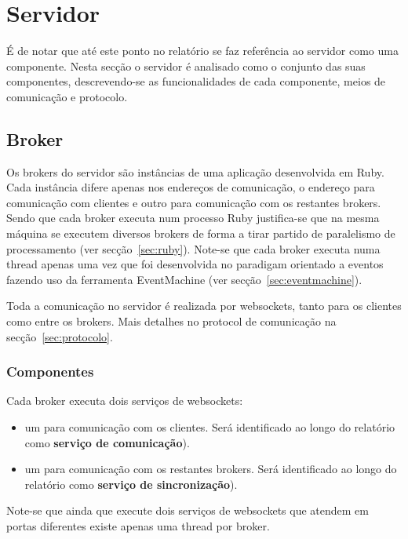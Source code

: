 \section{Servidor}

É de notar que até este ponto no relatório se faz referência ao servidor como uma componente.
Nesta secção o servidor é analisado como o conjunto das suas componentes, descrevendo-se as funcionalidades de cada componente, meios de comunicação e protocolo.


\subsection{Broker}

Os brokers do servidor são instâncias de uma aplicação desenvolvida em Ruby. Cada instância difere apenas nos endereços de comunicação, o endereço para comunicação com clientes e outro para comunicação com os restantes brokers.
Sendo que cada broker executa num processo Ruby justifica-se que na mesma máquina se executem diversos brokers de forma a tirar partido de paralelismo de processamento (ver secção~\ref{sec:ruby}).
Note-se que cada broker executa numa thread apenas uma vez que foi desenvolvida no paradigam orientado a eventos fazendo uso da ferramenta EventMachine (ver secção~\ref{sec:eventmachine}).

Toda a comunicação no servidor é realizada por websockets, tanto para os clientes como entre os brokers. Mais detalhes no protocol de comunicação na secção~\ref{sec:protocolo}.

\subsubsection{Componentes}
Cada broker executa dois serviços de websockets:

\begin{itemize}
\item um para comunicação com os clientes. Será identificado ao longo do relatório como \textbf{serviço de comunicação}).
\item um para comunicação com os restantes brokers. Será identificado ao longo do relatório como \textbf{serviço de sincronização}).
\end{itemize}

Note-se que ainda que execute dois serviços de websockets que atendem em portas diferentes existe apenas uma thread por broker.

